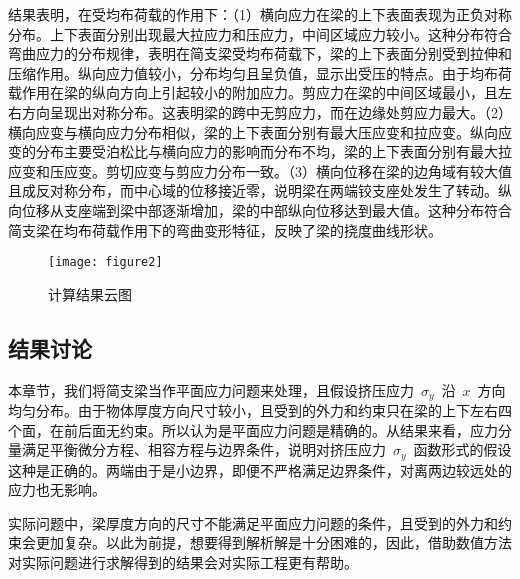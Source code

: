 结果表明，在受均布荷载的作用下：（1）横向应力在梁的上下表面表现为正负对称分布。上下表面分别出现最大拉应力和压应力，中间区域应力较小。这种分布符合弯曲应力的分布规律，表明在简支梁受均布荷载下，梁的上下表面分别受到拉伸和压缩作用。纵向应力值较小，分布均匀且呈负值，显示出受压的特点。由于均布荷载作用在梁的纵向方向上引起较小的附加应力。剪应力在梁的中间区域最小，且左右方向呈现出对称分布。这表明梁的跨中无剪应力，而在边缘处剪应力最大。（2）横向应变与横向应力分布相似，梁的上下表面分别有最大压应变和拉应变。纵向应变的分布主要受泊松比与横向应力的影响而分布不均，梁的上下表面分别有最大拉应变和压应变。剪切应变与剪应力分布一致。（3）横向位移在梁的边角域有较大值且成反对称分布，而中心域的位移接近零，说明梁在两端铰支座处发生了转动。纵向位移从支座端到梁中部逐渐增加，梁的中部纵向位移达到最大值。这种分布符合简支梁在均布荷载作用下的弯曲变形特征，反映了梁的挠度曲线形状。
\begin{figure}[htbp]
    \centering
	\texttt{[image: figure2]}
    \caption{计算结果云图}
    \label{fig:EPMplot}
\end{figure}
\subsection{结果讨论}
本章节，我们将简支梁当作平面应力问题来处理，且假设挤压应力~$\sigma_y$~沿~$x$~方向均匀分布。由于物体厚度方向尺寸较小，且受到的外力和约束只在梁的上下左右四个面，在前后面无约束。所以认为是平面应力问题是精确的。从结果来看，应力分量满足平衡微分方程、相容方程与边界条件，说明对挤压应力~$\sigma_y$~函数形式的假设这种是正确的。两端由于是小边界，即便不严格满足边界条件，对离两边较远处的应力也无影响。

实际问题中，梁厚度方向的尺寸不能满足平面应力问题的条件，且受到的外力和约束会更加复杂。以此为前提，想要得到解析解是十分困难的，因此，借助数值方法对实际问题进行求解得到的结果会对实际工程更有帮助。